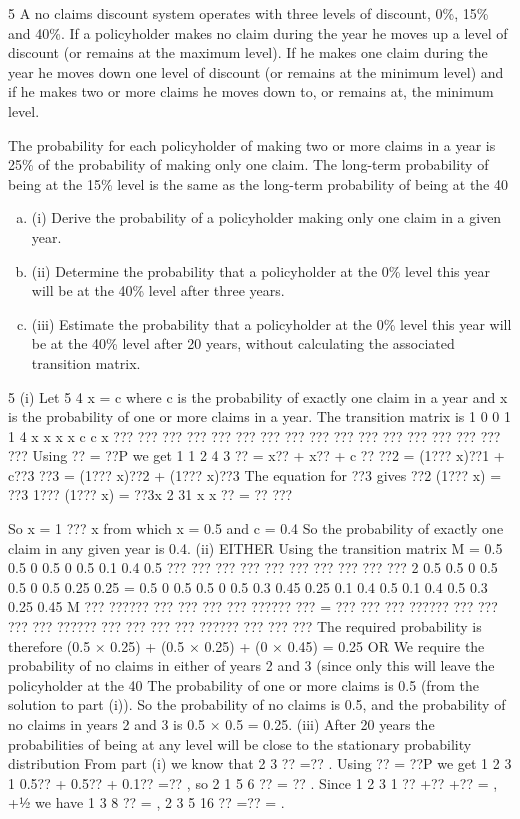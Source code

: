 \documentclass[a4paper,12pt]{article}
\begin{document}
5 A no claims discount system operates with three levels of discount, 0\%, 15\% and 40\%. If a policyholder makes no claim during the year he moves up a level of discount (or remains at the maximum level). If he makes one claim during the year he
moves down one level of discount (or remains at the minimum level) and if he makes two or more claims he moves down to, or remains at, the minimum level.

The probability for each policyholder of making two or more claims in a year is 25\% of the probability of making only one claim.
The long-term probability of being at the 15\% level is the same as the long-term probability of being at the 40%
\begin{enumerate}[(a)]
\item (i) Derive the probability of a policyholder making only one claim in a given
year. 
\item (ii) Determine the probability that a policyholder at the 0\% level this year will be at the 40\% level after three years. 
\item (iii) Estimate the probability that a policyholder at the 0\% level this year will be at the 40\% level after 20 years, without calculating the associated transition
matrix. 
\end{enumerate}
5
(i) Let 5
4
x = c
where c is the probability of exactly one claim in a year and x is the probability of one
or more claims in a year.
The transition matrix is
1 0
0 1
1
4
x x
x x
c c x
??? ???
??? ??? ???
??? ???
??? ??? ???
??? ???
??? ??? ???
??? ???
Using ?? = ??P we get
1 1 2 4 3
?? = x?? + x?? + c ??
??2 = (1??? x)??1 + c??3
??3 = (1??? x)??2 + (1??? x)??3
The equation for ??3 gives
??2 (1??? x) = ??3 {1??? (1??? x)} = ??3x
2 31
x
x
?? = ??
???

So x = 1 ??? x from which x = 0.5 and c = 0.4
So the probability of exactly one claim in any given year is 0.4.
(ii) EITHER
Using the transition matrix
M =
0.5 0.5 0
0.5 0 0.5
0.1 0.4 0.5
??? ???
??? ???
??? ???
??? ???
??? ???
2
0.5 0.5 0 0.5 0.5 0 0.5 0.25 0.25
= 0.5 0 0.5 0.5 0 0.5 0.3 0.45 0.25
0.1 0.4 0.5 0.1 0.4 0.5 0.3 0.25 0.45
M
??? ?????? ??? ??? ???
??? ?????? ??? = ??? ??? ??? ?????? ??? ??? ???
??? ?????? ??? ??? ???
??? ?????? ??? ??? ???
The required probability is therefore
(0.5 × 0.25) + (0.5 × 0.25) + (0 × 0.45) = 0.25
OR
We require the probability of no claims in either of years 2 and 3 (since only this will
leave the policyholder at the 40%
The probability of one or more claims is 0.5 (from the solution to part (i)).
So the probability of no claims is 0.5, and the probability of no claims in years 2 and 3
is 0.5 × 0.5 = 0.25.
(iii) After 20 years the probabilities of being at any level will be close to the
stationary probability distribution
From part (i) we know that 2 3 ?? =?? .
Using ?? = ??P we get
1 2 3 1 0.5?? + 0.5?? + 0.1?? =?? ,
so 2 1
5
6
?? = ?? .
Since 1 2 3 1 ?? +?? +?? = , +½
we have 1
3
8
?? = , 2 3
5
16
?? =?? = .
\end{document}
